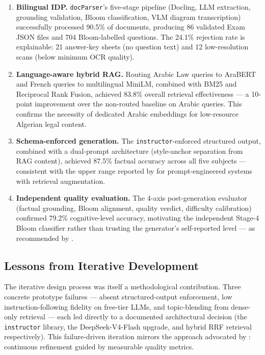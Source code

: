 \begin{enumerate}
  \item \textbf{Bilingual IDP.}
  \texttt{docParser}'s five-stage pipeline (Docling, LLM extraction, grounding
  validation, Bloom classification, VLM diagram transcription) successfully processed
  90.5\% of documents, producing 86 validated Exam JSON files and 704 Bloom-labelled
  questions. The 24.1\% rejection rate is explainable: 21 answer-key sheets (no
  question text) and 12 low-resolution scans (below minimum OCR quality).

  \item \textbf{Language-aware hybrid RAG.}
  Routing Arabic Law queries to AraBERT and French queries to multilingual MiniLM,
  combined with BM25 and Reciprocal Rank Fusion, achieved 83.8\% overall retrieval
  effectiveness --- a 10-point improvement over the non-routed baseline on Arabic
  queries. This confirms the necessity of dedicated Arabic embeddings for low-resource
  Algerian legal content.

  \item \textbf{Schema-enforced generation.}
  The \texttt{instructor}-enforced structured output, combined with a dual-prompt
  architecture (style-anchor separation from RAG content), achieved 87.5\% factual
  accuracy across all five subjects --- consistent with the upper range reported by
  \citet{mucciaccia2025mcq} for prompt-engineered systems with retrieval augmentation.

  \item \textbf{Independent quality evaluation.}
  The 4-axis post-generation evaluator (factual grounding, Bloom alignment, quality
  verdict, difficulty calibration) confirmed 79.2\% cognitive-level accuracy,
  motivating the independent Stage-4 Bloom classifier rather than trusting the
  generator's self-reported level --- as recommended by \citet{meissner2024itemforge}.
\end{enumerate}

\subsection*{Lessons from Iterative Development}

The iterative design process was itself a methodological contribution.
Three concrete prototype failures --- absent structured-output enforcement, low
instruction-following fidelity on free-tier LLMs, and topic-blending from
dense-only retrieval --- each led directly to a documented architectural decision
(the \texttt{instructor} library, the DeepSeek-V4-Flash upgrade, and hybrid RRF
retrieval respectively). This failure-driven iteration mirrors the approach
advocated by \citet{isley2025quality}: continuous refinement guided by measurable
quality metrics.

